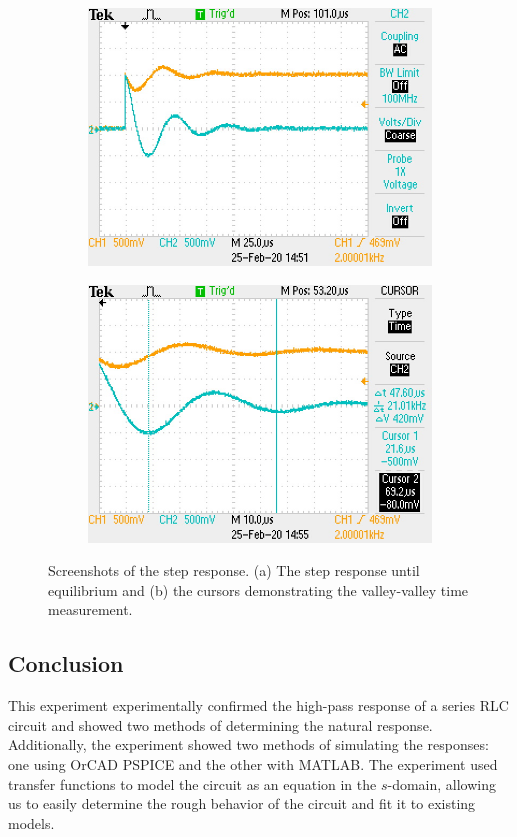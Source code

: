 \documentclass{report}
\begin{document}
\begin{figure}[h]
	\centering
	\begin{subfigure}{0.4\textwidth}
		\centering
	\includegraphics[width=\linewidth]{"Lab 6 Pics/F0002TEK"}
		\caption{}
	\end{subfigure}
	\begin{subfigure}{0.4\textwidth}
		\centering
		\includegraphics[width=\linewidth]{"Lab 6 Pics/F0003TEK"}
		\caption{}
	\end{subfigure}
	\caption{Screenshots of the step response. (a) The step response until equilibrium and (b) the cursors demonstrating the valley-valley time measurement.}
	\label{fig:f0003tek}
\end{figure}
\subsection{Conclusion}
This experiment experimentally confirmed the high-pass response of a series RLC circuit and showed two methods of determining the natural response. Additionally, the experiment showed two methods of simulating the responses: one using OrCAD PSPICE and the other with MATLAB. The experiment used transfer functions to model the circuit as an equation in the $s$-domain, allowing us to easily determine the rough behavior of the circuit and fit it to existing models.
\end{document}
